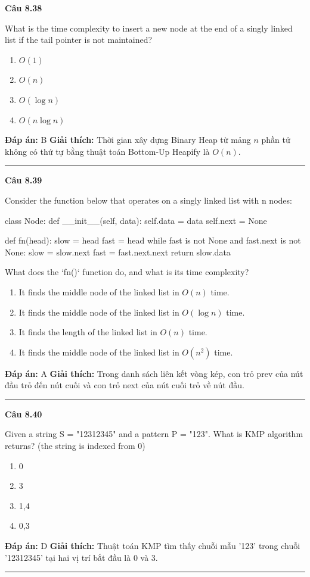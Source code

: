 \documentclass[11pt,a4paper]{article}
\newenvironment{question}[1]{%
  \par\vspace{1em}\noindent\textbf{\large Câu #1}\par\vspace{0.4em}
}{%
  \par\vspace{1em}\hrule\vspace{0.6em}
}
\newenvironment{choices}{%
  \begin{enumerate}[label=\textbf{\Alph*.},leftmargin=2.2em,itemsep=2pt,topsep=3pt]
}{%
  \end{enumerate}
}
\newcommand{\choice}{\item}
\newenvironment{codebox}{%
  \begin{tcolorbox}[colback=gray!8!white,colframe=gray!50!black,arc=1.5mm,boxrule=0.6pt,left=3mm,right=3mm,top=2.5mm,bottom=2.5mm]
  \ttfamily\small
}{%
  \end{tcolorbox}
}
\begin{document}
\begin{question}{8.38}
What is the time complexity to insert a new node at the end of a singly linked list if the tail pointer is not maintained?
\begin{choices}
\choice \(O(1)\)
\choice \(O(n)\)
\choice \(O(\log n)\)
\choice \(O(n \log n)\)
\end{choices}
\textbf{Đáp án:} B
\textbf{Giải thích:} Thời gian xây dựng Binary Heap từ mảng \(n\) phần tử không có thứ tự bằng thuật toán Bottom-Up Heapify là \(O(n)\).
\end{question}

\begin{question}{8.39}
Consider the function below that operates on a singly linked list with n nodes:
\begin{codebox}
class Node:
    def __init__(self, data):
        self.data = data
        self.next = None

def fn(head):
    slow = head
    fast = head
    while fast is not None and fast.next is not None:
        slow = slow.next
        fast = fast.next.next
    return slow.data
\end{codebox}
What does the `fn()` function do, and what is its time complexity?
\begin{choices}
\choice It finds the middle node of the linked list in \(O(n)\) time.
\choice It finds the middle node of the linked list in \(O(\log n)\) time.
\choice It finds the length of the linked list in \(O(n)\) time.
\choice It finds the middle node of the linked list in \(O(n^2)\) time.
\end{choices}
\textbf{Đáp án:} A
\textbf{Giải thích:} Trong danh sách liên kết vòng kép, con trỏ prev của nút đầu trỏ đến nút cuối và con trỏ next của nút cuối trỏ về nút đầu.
\end{question}

\begin{question}{8.40}
Given a string S = "12312345" and a pattern P = "123". What is KMP algorithm returns? (the string is indexed from 0)
\begin{choices}
\choice 0
\choice 3
\choice 1,4
\choice 0,3
\end{choices}
\textbf{Đáp án:} D
\textbf{Giải thích:} Thuật toán KMP tìm thấy chuỗi mẫu '123' trong chuỗi '12312345' tại hai vị trí bắt đầu là 0 và 3.
\end{question}
\end{document}
